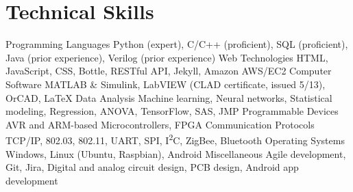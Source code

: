 \section{Technical Skills}
\begin{cvskills}
  \cvskill
    {Programming Languages}
    {Python (expert), C/C++ (proficient), SQL (proficient), Java (prior experience), Verilog (prior experience)}
  \cvskill
    {Web Technologies}
    {HTML, JavaScript, CSS, Bottle, RESTful API, Jekyll, Amazon AWS/EC2}
  \cvskill
    {Computer Software}
    {MATLAB \& Simulink, LabVIEW (CLAD certificate, issued 5/13), OrCAD, LaTeX}
  \cvskill
    {Data Analysis}
    {Machine learning, Neural networks, Statistical modeling, Regression, ANOVA, TensorFlow, SAS, JMP}
  \cvskill
    {Programmable Devices}
    {AVR and ARM-based Microcontrollers, FPGA}
  \cvskill
    {Communication Protocols}
    {TCP/IP, 802.03, 802.11, UART, SPI, I\textsuperscript{2}C, ZigBee, Bluetooth}
  \cvskill
    {Operating Systems}
    {Windows, Linux (Ubuntu, Raspbian), Android}
  \cvskill
    {Miscellaneous}
    {Agile development, Git, Jira, Digital and analog circuit design, PCB design, Android app development}
\end{cvskills} 